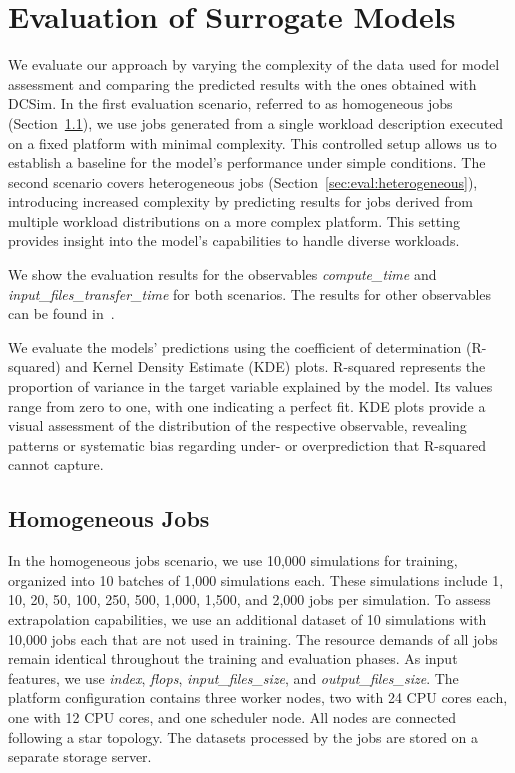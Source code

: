 \section{Evaluation of Surrogate Models}
\label{sec:eval}

We evaluate our approach by varying the complexity of the data used for model assessment and comparing the predicted results with the ones obtained with DCSim. 
%
In the first evaluation scenario, referred to as homogeneous jobs (Section~\ref{sec:eval:homogeneous}), we use jobs generated from a single workload description executed on a fixed platform with minimal complexity. 
%
This controlled setup allows us to establish a baseline for the model's performance under simple conditions. 
%
The second scenario covers heterogeneous jobs (Section~\ref{sec:eval:heterogeneous}), introducing increased complexity by predicting results for jobs derived from multiple workload distributions on a more complex platform. 
%
This setting provides insight into the model's capabilities to handle diverse workloads. 

We show the evaluation results for the observables \textit{compute\_time} and \textit{input\_files\_transfer\_time} for both scenarios. The results for other observables can be found in~\cite{Zhyla2024}. 

We evaluate the models' predictions using the coefficient of determination (R-squared) and Kernel Density Estimate (KDE) plots. 
%
R-squared represents the proportion of variance in the target variable explained by the model. Its values range from zero to one, with one indicating a perfect fit. %
%
KDE plots provide a visual assessment of the distribution of the respective observable, revealing patterns or systematic bias regarding under- or overprediction that R-squared cannot capture. 

\subsection{Homogeneous Jobs} \label{sec:eval:homogeneous}

In the homogeneous jobs scenario, we use 10,000 simulations for training, organized into 10 batches of 1,000 simulations each. 
%
These simulations include 1, 10, 20, 50, 100, 250, 500, 1,000, 1,500, and 2,000 jobs per simulation. 
%
To assess extrapolation capabilities, we use an additional dataset of 10 simulations with 10,000 jobs each that are not used in training. 
%
The resource demands of all jobs remain identical throughout the training and evaluation phases.
%
%
As input features, we use \textit{index}, \textit{flops}, \textit{input\_files\_size}, and \textit{output\_files\_size}. 
%
%
The platform configuration contains three worker nodes, two with 24 CPU cores each, one with 12 CPU cores, and one scheduler node. 
%
All nodes are connected following a star topology. 
%
The datasets processed by the jobs are stored on a separate storage server. 
%
%

